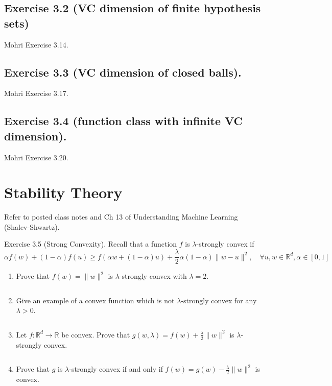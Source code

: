 \documentclass[
10pt, %
a4paper, %
oneside, %
headinclude,footinclude, %
BCOR5mm, %
]{scrartcl}
\begin{document}
\subsection*{Exercise 3.2 (VC dimension of finite hypothesis sets)}
Mohri Exercise 3.14.

\subsection*{Exercise 3.3 (VC dimension of closed balls).}
Mohri Exercise 3.17.

\subsection*{Exercise 3.4 (function class with infinite VC dimension).}
Mohri Exercise 3.20.

\section*{Stability Theory}
Refer to posted class notes and Ch 13 of Understanding Machine Learning (Shalev-Shwartz).

Exercise 3.5 (Strong Convexity). Recall that a function $f$ is $\lambda$-strongly convex if
\[
\alpha f(w) + (1 - \alpha)f(u) \geq f(\alpha w + (1 - \alpha)u) + \frac{\lambda}{2} \alpha(1 - \alpha)\|w - u\|^2, \quad \forall u, w \in \mathbb{R}^d , \alpha \in [0, 1]
\]

\begin{enumerate}
    \item Prove that $f(w) = \|w\|^2$ is $\lambda$-strongly convex with $\lambda = 2$.

    \[\] %

    \item Give an example of a convex function which is not $\lambda$-strongly convex for any $\lambda > 0$.

    \[\] %

    \item Let $f : \mathbb{R}^d \rightarrow \mathbb{R}$ be convex. Prove that $g(w, \lambda) = f(w) + \frac{\lambda}{2}\|w\|^2$ is $\lambda$-strongly convex.

    \[\] %

    \item Prove that $g$ is $\lambda$-strongly convex if and only if $f(w) = g(w) - \frac{\lambda}{2}\|w\|^2$ is convex.

    \[\] %
\end{enumerate}
\end{document}
